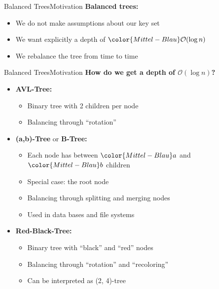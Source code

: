 
\begin{frame}{Balanced Trees}{Motivation}
  \textbf{Balanced trees:}
  \begin{itemize}
    \item
      We do not make assumptions about our {\color{Mittel-Blau}key set}
    \item
      We want explicitly a depth of ${\color{Mittel-Blau}\mathcal{O}(\log n)}$
    \item
      We {\color{Mittel-Blau}rebalance} the tree from time to time
  \end{itemize}
\end{frame}


\begin{frame}{Balanced Trees}{Motivation}
  \textbf{How do we get a depth of $\mathcal{O}(\log n)$?}
  \begin{itemize}
    \item
      \textbf{AVL-Tree:}
      \begin{itemize}
        \item
          Binary tree with 2 children per node
        \item
          Balancing through \enquote{\color{Mittel-Blau}rotation}
      \end{itemize}
    \item
      \textbf{(a,b)-Tree} or \textbf{B-Tree:}
      \begin{itemize}
        \item
          Each node has between ${\color{Mittel-Blau}a}$ and
          ${\color{Mittel-Blau}b}$ children
        \item
          Special case: the root node
        \item
          Balancing through {\color{Mittel-Blau}splitting} and
          {\color{Mittel-Blau}merging} nodes
        \item
          Used in data bases and file systems
      \end{itemize}
    \item
      \textbf{Red-Black-Tree:}
      \begin{itemize}
        \item
          Binary tree with \enquote{black} and \enquote{red} nodes
        \item
          Balancing through \enquote{\color{Mittel-Blau}rotation} and
          \enquote{\color{Mittel-Blau}recoloring}
        \item
          Can be interpreted as (2, 4)-tree
      \end{itemize}
  \end{itemize}
\end{frame}